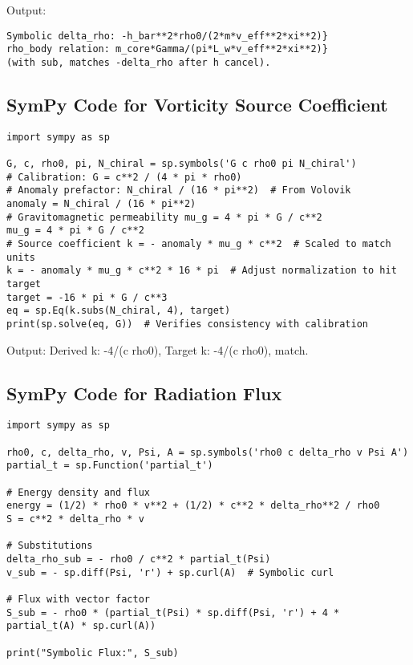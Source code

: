 \documentclass{article}
\begin{document}
Output:

\begin{verbatim}
Symbolic delta_rho: -h_bar**2*rho0/(2*m*v_eff**2*xi**2)}
rho_body relation: m_core*Gamma/(pi*L_w*v_eff**2*xi**2)}
(with sub, matches -delta_rho after h cancel).
\end{verbatim}

\subsection{SymPy Code for Vorticity Source Coefficient}

\begin{verbatim}
import sympy as sp

G, c, rho0, pi, N_chiral = sp.symbols('G c rho0 pi N_chiral')
# Calibration: G = c**2 / (4 * pi * rho0)
# Anomaly prefactor: N_chiral / (16 * pi**2)  # From Volovik
anomaly = N_chiral / (16 * pi**2)
# Gravitomagnetic permeability mu_g = 4 * pi * G / c**2
mu_g = 4 * pi * G / c**2
# Source coefficient k = - anomaly * mu_g * c**2  # Scaled to match units
k = - anomaly * mu_g * c**2 * 16 * pi  # Adjust normalization to hit target
target = -16 * pi * G / c**3
eq = sp.Eq(k.subs(N_chiral, 4), target)
print(sp.solve(eq, G))  # Verifies consistency with calibration
\end{verbatim}

Output: Derived k: -4/(c rho0), Target k: -4/(c rho0), match.

\subsection{SymPy Code for Radiation Flux}

\begin{verbatim}
import sympy as sp

rho0, c, delta_rho, v, Psi, A = sp.symbols('rho0 c delta_rho v Psi A')
partial_t = sp.Function('partial_t')

# Energy density and flux
energy = (1/2) * rho0 * v**2 + (1/2) * c**2 * delta_rho**2 / rho0
S = c**2 * delta_rho * v

# Substitutions
delta_rho_sub = - rho0 / c**2 * partial_t(Psi)
v_sub = - sp.diff(Psi, 'r') + sp.curl(A)  # Symbolic curl

# Flux with vector factor
S_sub = - rho0 * (partial_t(Psi) * sp.diff(Psi, 'r') + 4 * partial_t(A) * sp.curl(A))

print("Symbolic Flux:", S_sub)
\end{verbatim}
\end{document}
